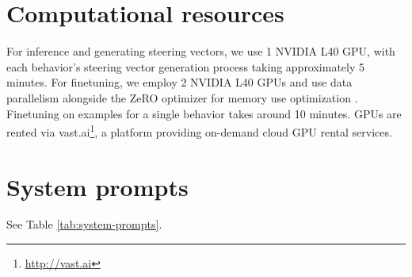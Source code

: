 \documentclass[11pt]{article}
\begin{document}
\section{Computational resources}

For inference and generating steering vectors, we use 1 NVIDIA L40 GPU, with each behavior's steering vector generation process taking approximately 5 minutes. For finetuning, we employ 2 NVIDIA L40 GPUs and use data parallelism alongside the ZeRO optimizer for memory use optimization \citep{zerooptim}. Finetuning on examples for a single behavior takes around 10 minutes. GPUs are rented via vast.ai\footnote{\url{http://vast.ai}}, a platform providing on-demand cloud GPU rental services.

\section{System prompts}
\label{system-prompts}

See Table \ref{tab:system-prompts}.
\end{document}
